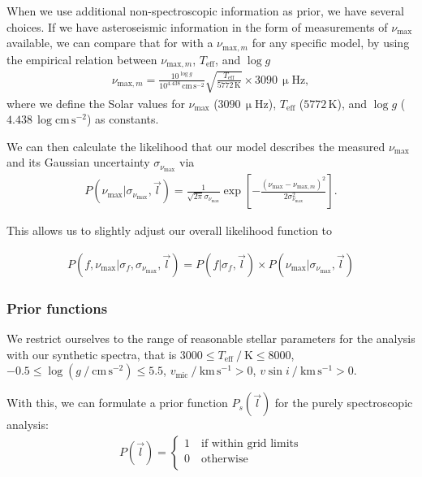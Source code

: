 \documentclass[
  journal=pasa,
  manuscript=research-paper, %
  year=2021,
  volume=37,
]{cup-journal}
\newcommand{\Teff}{$T_\mathrm{eff}$\xspace}
\newcommand{\logg}{$\log g$\xspace}
\begin{document}
When we use additional non-spectroscopic information as prior, we have several choices. If we have asteroseismic information in the form of measurements of $\nu_\text{max}$ available, we can compare that for with a $\nu_{\text{max},m}$ for any specific model, by using the empirical relation \citep{Kjeldsen1995} between $\nu_{\text{max},m}$, \Teff, and \logg
\begin{align}
    \nu_{\text{max},m} = \frac{10^{\log g}}{10^{4.438}\,\mathrm{cm\,s^{-2}}} \sqrt{\frac{T_\text{eff}}{5772\,\mathrm{K}}} \times 3090\,\mathrm{\upmu Hz},
\end{align}
where we define the Solar values for $\nu_\text{max}$ ($3090\,\mathrm{\upmu Hz}$), $T_\mathrm{eff}$ ($5772\,\mathrm{K}$), and $\log g$ ($4.438\,\log{\mathrm{cm\,s^{-2}}}$) as constants.

We can then calculate the likelihood that our model describes the measured $\nu_\text{max}$ and its Gaussian uncertainty $\sigma_{\nu_\text{max}}$ via
\begin{align}
    P (\nu_\text{max} \vert \sigma_{\nu_\text{max}}, \vec{l}) = \frac{1}{\sqrt{2 \pi} \sigma_{\nu_\text{max}}} \exp \left[ - \frac{\left( \nu_\text{max} - \nu_{\text{max},m} \right)^2}{2\sigma_{\nu_\text{max}}^2} \right].
\end{align}

This allows us to slightly adjust our overall likelihood function to

\begin{align}
    P ( f, \nu_\text{max} \vert \sigma_{f}, \sigma_{\nu_\text{max}}, \vec{l} ) = P ( f \vert \sigma_{f}, \vec{l} ) \times P (\nu_\text{max} \vert \sigma_{\nu_\text{max}}, \vec{l})
\end{align}

\subsubsection{Prior functions}

We restrict ourselves to the range of reasonable stellar parameters for the analysis with our synthetic spectra, that is $3000 \leq T_\mathrm{eff}~/~\mathrm{K} \leq 8000$, $-0.5 \leq \log (g~/~\mathrm{cm\,s^{-2}}) \leq 5.5$, $v_\text{mic}~/~\mathrm{km\,s^{-1}} > 0$, $v \sin i~/~\mathrm{km\,s^{-1}} > 0$.

With this, we can formulate a prior function $P_s (\vec{l})$ for the purely spectroscopic analysis:
\begin{align}
    P ( \vec{l} ) = \begin{cases}
    1 \quad \text{if within grid limits} \\
    0 \quad \text{otherwise} \\
    \end{cases}
\end{align}
\end{document}
